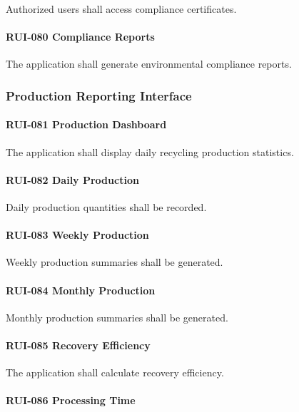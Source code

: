 Authorized users shall access compliance certificates.

\paragraph{RUI-080 Compliance Reports}

The application shall generate environmental compliance reports.


\subsubsection*{Production Reporting Interface}

\paragraph{RUI-081 Production Dashboard}

The application shall display daily recycling production statistics.

\paragraph{RUI-082 Daily Production}

Daily production quantities shall be recorded.

\paragraph{RUI-083 Weekly Production}

Weekly production summaries shall be generated.

\paragraph{RUI-084 Monthly Production}

Monthly production summaries shall be generated.

\paragraph{RUI-085 Recovery Efficiency}

The application shall calculate recovery efficiency.

\paragraph{RUI-086 Processing Time}

